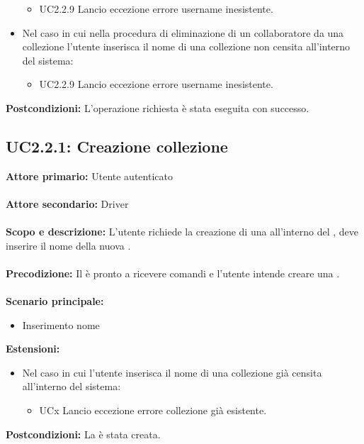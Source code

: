 \documentclass{scalatekids-article}
\begin{document}
\begin{itemize}
  \begin{itemize}
    \item UC2.2.9 Lancio eccezione errore username inesistente.
  \end{itemize}
  \item Nel caso in cui nella procedura di eliminazione di un collaboratore da una collezione l'utente inserisca il nome di una collezione non censita all'interno del sistema:
  \begin{itemize}
    \item UC2.2.9 Lancio eccezione errore username inesistente.
  \end{itemize}
\end{itemize}
\textbf{Postcondizioni:} L'operazione richiesta è stata eseguita con successo.

\subsection{UC2.2.1: Creazione collezione}

\textbf{Attore primario:} Utente autenticato\\ \\
\textbf{Attore secondario:} Driver\\ \\
\textbf{Scopo e descrizione:} L'utente richiede la creazione di una  all'interno del , deve inserire il nome della nuova .\\ \\
\textbf{Precodizione:} Il  è pronto a ricevere comandi e l'utente intende creare una .\\ \\
\textbf{Scenario principale:}
\begin{itemize}
\item Inserimento nome 
\end{itemize}
\textbf{Estensioni:}
\begin{itemize}
\item Nel caso in cui l'utente inserisca il nome di una collezione già censita all'interno del sistema:
  \begin{itemize}
  \item UCx Lancio eccezione errore collezione già esistente.
  \end{itemize}
\end{itemize}
\textbf{Postcondizioni:} La  è stata creata.
\end{document}
